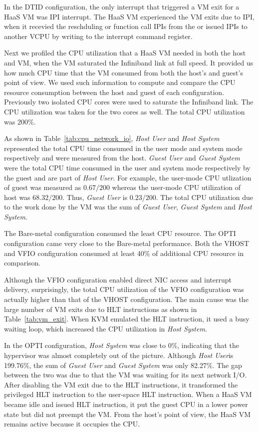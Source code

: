 In the DTID configuration, the only interrupt that triggered a
VM exit for a HaaS VM was IPI interrupt. The HaaS VM
experienced the VM exits due to IPI, when it recevied the
reschduling or function call IPIs from the \na 
or issued IPIs to another VCPU by writing to the interrupt
command register.

Next we profiled the CPU utilization that a HaaS VM needed in
both the host and VM, when the VM saturated the Infiniband
link at full speed. It provided us how much CPU time that the
VM consumed from both the host's and guest's point of view. We
used such information to compute and compare the CPU resource
consumption between the host and guest of each configuration.
Previously two isolated CPU cores were used to saturate the
Infiniband link. The CPU utilization was taken for the two
cores as well. The total CPU utilization was 200\%.

As shown in Table~\ref{tab:cpu_network_io}, \emph{Host
User} and \emph{Host System} represented the total CPU time
consumed in the user mode and system mode respectively and
were measured from the host. \emph{Guest User} and \emph{Guest
System} were the total CPU time consumed in the user and
system mode respectively by the guest and are part of
\emph{Host User}. For example, the user-mode CPU utlization of
guest was measured as $0.67/200$ whereas the user-mode CPU
utilization of host was $68.32/200$. Thus, \emph{Guest User}
is $0.23/200$. The total CPU utilization due to the work done
by the VM was the sum of \emph{Guest User}, \emph{Guest
System} and \emph{Host System}.

The Bare-metal configuration consumed the least CPU resource.
The OPTI configuration came very close to the Bare-metal
performance. Both the VHOST and VFIO configuration consumed at
least 40\% of additional CPU resource in comparison.

Although the VFIO configuration enabled direct NIC access and
interrupt delivery, surprisingly, the total CPU utilization of
the VFIO configuration was actually higher than that of the
VHOST configuration. The main cause was the large number of VM
exits due to HLT instructions as shown in
Table~\ref{tab:vm_exit}. When KVM emulated the HLT
instruction, it used a busy waiting loop, which
increased the CPU utilization in \emph{Host System}.

In the OPTI configuration, \emph{Host System} was close to
0\%, indicating that the hypervisor was almost completely out
of the picture. Although \emph{Host User}is 199.76\%, the sum
of \emph{Guest User} and \emph{Guest System} was only 82.27\%.
The gap between the two was due to that the VM was waiting for
its next network I/O. After disabling the VM exit due to the
HLT instructions, it transformed the privileged HLT
instruction to the user-space HLT instruction. When a HaaS VM
became idle and issued HLT instruction, it put the guest CPU
in a lower power state but did not preempt the VM. From the
host's point of view, the HaaS VM remains active because it
occupies the CPU.


